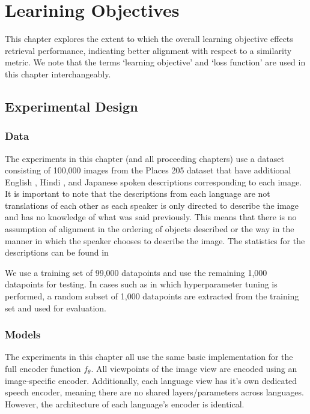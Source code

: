 \chapter{Learining Objectives}

This chapter explores the extent to which the overall learning objective effects retrieval performance, indicating better alignment with respect to a similarity metric.
We note that the terms `learning objective' and `loss function' are used in this chapter interchangeably.




\section{Experimental Design}
\subsection{Data}
The experiments in this chapter (and all proceeding chapters) use a dataset consisting of 100,000 images from the Places 205 dataset \citeme{} that have additional English \citeme{}, Hindi \citeme{}, and Japanese \citeme{} spoken descriptions corresponding to each image.
It is important to note that the descriptions from each language are not translations of each other as each speaker is only directed to describe the image and has no knowledge of what was said previously. 
This means that there is no assumption of alignment in the ordering of objects described or the way in the manner in which the speaker chooses to describe the image.
The statistics for the descriptions can be found in 

We use a training set of 99,000 datapoints and use the remaining 1,000 datapoints for testing. 
In cases such as \dftwrds{} in which hyperparameter tuning is performed, a random subset of 1,000 datapoints are extracted from the training set and used for evaluation.
\subsection{Models}
\label{section:obj_exp_models}
The experiments in this chapter all use the same basic implementation for the full encoder function $f_\theta$.
All viewpoints of the image view are encoded using an image-specific encoder.
Additionally, each language view has it's own dedicated speech encoder, meaning there are no shared layers/parameters across languages.
However, the architecture of each language's encoder is identical.

